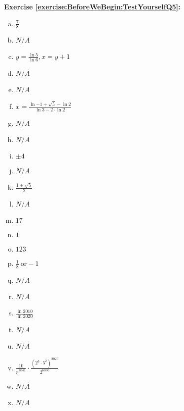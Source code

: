 \noindent\textbf{Exercise \ref{exercise:BeforeWeBegin:TestYourselfQ5}:}
\begin{enumerate}[(a)]
\item  $ \frac{7}{8}$ 
\item  $ N/A$
\item  $ y = \frac{\ln{5}}{\ln{6} } , x = y + 1$
\item  $ N/A$
\item  $ N/A$
\item  $x = \frac{\displaystyle \ln{-1 + \sqrt{5}} - \ln{2} }{\displaystyle \ln{3} - 2 \cdot \ln{2} }$
\item  $ N/A$
\item  $ N/A$
\item  $ \pm 4 $
\item  $ N/A$
\item  $ \frac{ 1 \pm \sqrt{5} }{2}$
\item  $ N/A$
\item  $ 17$
\item  $ 1 $
\item  $ 123 $
\item  $ \frac{1}{8} ~\text{or} -1$
\item  $ N/A$
\item  $ N/A$
\item  $ \frac{ \ln{2010} }{ \ln{2020} }$
\item  $ N/A$
\item  $ N/A$
\item  $  \frac{ \displaystyle 10}{\displaystyle 5^{4041}} \cdot \frac{\displaystyle ( 2^3 \cdot 5^2  ) ^ {2020} }{\displaystyle 2^{6060} }$
\item  $ N/A$
\item  $ N/A$
\end{enumerate}